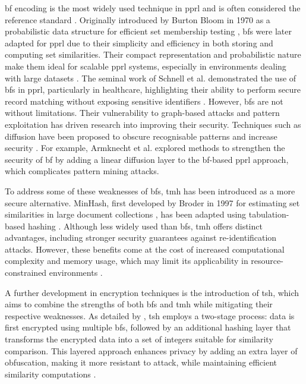 \ac{bf} encoding is the most widely used technique in \ac{pprl} and is often considered the reference standard \cite{schaefer2024}. 
Originally introduced by Burton Bloom in 1970 as a probabilistic data structure for efficient set membership testing \cite{bloom1970space}, \ac{bf}s were later adapted for \ac{pprl} due to their simplicity and efficiency in both storing and computing set similarities. 
Their compact representation and probabilistic nature make them ideal for scalable \ac{pprl} systems, especially in environments dealing with large datasets \cite{schnell2009privacy}. 
The seminal work of Schnell et al. demonstrated the use of \ac{bf}s in \ac{pprl}, particularly in healthcare, highlighting their ability to perform secure record matching without exposing sensitive identifiers \cite{schnell2009privacy}.
However, \ac{bf}s are not without limitations. 
Their vulnerability to graph-based attacks and pattern exploitation has driven research into improving their security. 
Techniques such as diffusion have been proposed to obscure recognisable patterns and increase security \cite{schaefer2024,armknecht2023strengthening}. 
For example, Armknecht et al. \cite{armknecht2023strengthening} explored methods to strengthen the security of \ac{bf} by adding a linear diffusion layer to the \ac{bf}-based \ac{pprl} approach, which complicates pattern mining attacks.

To address some of these weaknesses of \ac{bf}s, \ac{tmh} has been introduced as a more secure alternative. 
MinHash, first developed by Broder in 1997 for estimating set similarities in large document collections \cite{broder1997resemblance}, has been adapted using tabulation-based hashing \cite{smith2017secure}.
Although less widely used than \ac{bf}s, \ac{tmh} offers distinct advantages, including stronger security guarantees against re-identification attacks. 
However, these benefits come at the cost of increased computational complexity and memory usage, which may limit its applicability in resource-constrained environments \cite{smith2017secure}.

A further development in encryption techniques is the introduction of \ac{tsh}, which aims to combine the strengths of both \ac{bf}s and \ac{tmh} while mitigating their respective weaknesses.
As detailed by \cite{ranbaduge2020secure}, \ac{tsh} employs a two-stage process: data is first encrypted using multiple \ac{bf}s, followed by an additional hashing layer that transforms the encrypted data into a set of integers suitable for similarity comparison. 
This layered approach enhances privacy by adding an extra layer of obfuscation, making it more resistant to attack, while maintaining efficient similarity computations \cite{vidanage2020graph, ranbaduge2020secure}.

